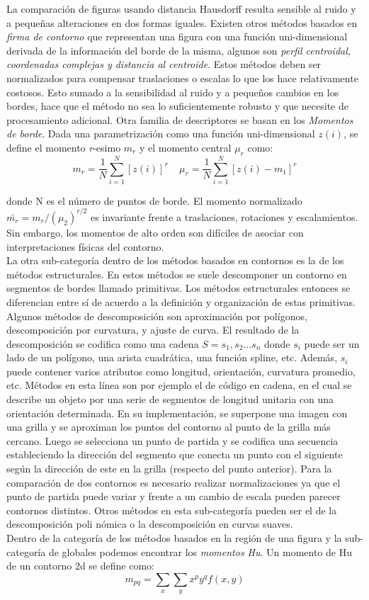 La comparación de figuras usando distancia Hausdorff resulta sensible 
al ruido y a pequeñas alteraciones en dos formas iguales. Existen otros métodos basados
en \textit{firma de contorno} que  representan una figura con una 
función uni-dimensional derivada de la información del borde de la 
misma, 
algunos son \textit{perfil centroidal, coordenadas complejas y distancia al centroide}. Estos métodos deben ser normalizados para compensar
traslaciones o escalas lo que los hace relativamente costosos. Esto sumado a la sensibilidad al ruido y a pequeños cambios en los bordes, hace que el método 
no sea lo suficientemente robusto y que necesite de procesamiento adicional. Otra familia de descriptores se basan en los 
\textit{Momentos de borde}. Dada una parametrización como una función 
uni-dimensional $z (i)$, se define el momento \textit{r}-esimo \textit{$m_r$} 
y el momento central $\mu_r$ como:
\[
	m_r=\frac{1}{N} \sum_{i=1}^{N}{[z(i)]^r}\ \ \ \ \
	\mu_r=\frac{1}{N} \sum_{i=1}^{N}{[z(i) - m_1]^r}
\]

donde N es el número de puntos de borde. El momento normalizado $\bar{m_r}=m_r / (\mu_2)^{r/2}$
es invariante frente a traslaciones, rotaciones y escalamientos. Sin 
embargo, los momentos de alto orden
son difíciles de asociar con interpretaciones físicas del contorno.\\
\indent La otra sub-categoría dentro de los métodos basados en contornos es la de los métodos estructurales.
En estos métodos se suele descomponer un contorno en segmentos de bordes llamado primitivas. Los métodos estructurales
entonces se diferencian entre sí de acuerdo a la definición y organización de estas primitivas. Algunos métodos
de descomposición son aproximación por polígonos, descomposición por curvatura, y ajuste de curva. El resultado
de la descomposición se codifica como una cadena $S=s_1,s_2...s_n$ donde $s_i$ puede ser un lado de un polígono, una 
arista cuadrática, una función spline, etc. Además, $s_i$ puede contener varios atributos como longitud, orientación, curvatura promedio, etc.
Métodos en esta línea son por ejemplo el de código en cadena, en el cual se describe un objeto por una serie de segmentos de longitud unitaria
con una orientación determinada. En su implementación, se superpone una imagen con una grilla y se aproximan los puntos del contorno al 
punto de la grilla más cercano. Luego se selecciona un punto de 
partida y se codifica una secuencia estableciendo la dirección del segmento
que conecta un punto con el siguiente según la dirección de este en 
la grilla (respecto del punto  anterior). Para la comparación de dos
contornos es necesario realizar normalizaciones ya que el punto de 
partida puede variar y frente a un cambio de escala pueden parecer 
contornos distintos. Otros métodos en esta sub-categoría pueden ser el de la descomposición poli nómica o la descomposición en curvas suaves. \\
\indent Dentro de la categoría de los métodos basados en la región 
de una figura y la sub-categoría de globales podemos encontrar los \textit{momentos Hu}.
Un momento de Hu de un contorno 2d se define como:
\[
	m_{pq}=\sum_{x}{\sum_{y}{x^py^qf(x,y)}}
\]

